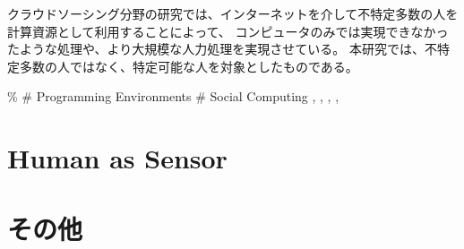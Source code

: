 \cite{cylog} \cite{crowdforge} \cite{community-based-crowdsourcing}
\cite{soylent}

クラウドソーシング分野の研究では、インターネットを介して不特定多数の人を計算資源として利用することによって、
コンピュータのみでは実現できなかったような処理や、より大規模な人力処理を実現させている。
本研究では、不特定多数の人ではなく、特定可能な人を対象としたものである。

\% \# Programming Environments \# Social Computing \cite{dog},
\cite{jabberwocky}, \cite{personal-api}, \cite{social-machines},

\section{Human as Sensor}\label{human-as-sensor}

\cite{prism} \cite{moboq} \cite{medusa}

\section{その他}\label{ux305dux306eux4ed6}

\cite{hapticturk} \cite{sharedo}
